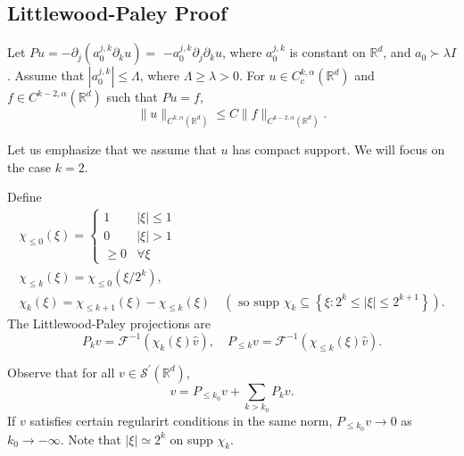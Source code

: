 \subsection{Littlewood-Paley Proof}

\begin{theorem}
\label{thm: Constant coefficient Schauder estimate}
 Let $P u=-\partial_{j}\left(a_{0}^{j, k} \partial_{k} u\right)=$ $-a_{0}^{j, k} \partial_{j} \partial_{k} u$, where $a_{0}^{j, k}$ is constant on $\mathbb{R}^{d}$, and $a_{0} \succ \lambda I$. Assume that $\left|a_{0}^{j, k}\right| \leq \Lambda$, where $\Lambda \geq \lambda>0$. For $u \in C_{c}^{k, \alpha}\left(\mathbb{R}^{d}\right)$ and $f \in C^{k-2, \alpha}\left(\mathbb{R}^{d}\right)$ such that $P u=f$,
$$
\|u\|_{C^{k, \alpha}\left(\mathbb{R}^{d}\right)} \leq C\|f\|_{C^{k-2, \alpha}\left(\mathbb{R}^{d}\right)} .
$$
\end{theorem}
Let us emphasize that we assume that $u$ has compact support. We will focus on the case $k=2$.


\begin{definition}
\label{def: Little-Paley projection}
Define 
$$
\begin{gathered}
\chi_{\leq 0}(\xi)= \begin{cases}1 & |\xi| \leq 1 \\
0 & |\xi|>1 \\
\geq 0 & \forall \xi\end{cases} \\
\chi_{\leq k}(\xi)=\chi_{\leq 0}\left(\xi / 2^{k}\right), \\
\chi_{k}(\xi)=\chi_{\leq k+1}(\xi)-\chi_{\leq k}(\xi) \quad\left(\text { so supp } \chi_{k} \subseteq\left\{\xi: 2^{k} \leq|\xi| \leq 2^{k+1}\right\}\right) .
\end{gathered}
$$
The Littlewood-Paley projections are 
\[
    P_{k} v=\mathcal{F}^{-1}\left(\chi_{k}(\xi) \widehat{v}\right), \quad P_{\leq k}v=\mathcal{F}^{-1}\left(\chi_{\leq k}(\xi) \widehat{v}\right).
\]
\end{definition}
Observe that for all $v \in \mathcal{S}^{\prime}\left(\mathbb{R}^{d}\right)$,
$$
v=P_{\leq k_{0}} v+\sum_{k>k_{0}} P_{k} v .
$$
If $v$ satisfies certain regularirt conditions in the same norm, $P_{\leq k_{0}} v \rightarrow 0$ as $k_{0} \rightarrow-\infty$. Note that $|\xi| \simeq 2^{k}$ on supp $\chi_{k}$.


